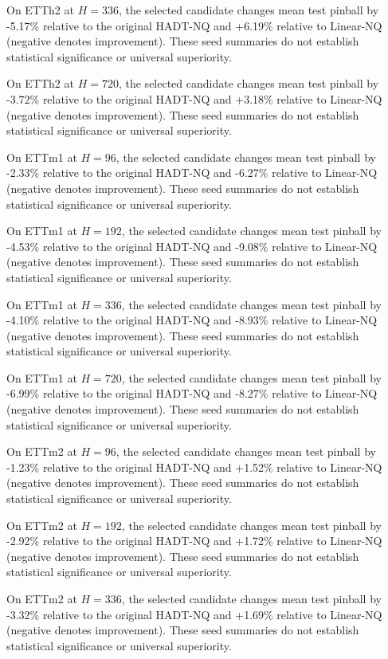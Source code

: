 On ETTh2 at $H=336$, the selected candidate changes mean test pinball by -5.17\% relative to the original HADT-NQ and +6.19\% relative to Linear-NQ (negative denotes improvement). These seed summaries do not establish statistical significance or universal superiority.

On ETTh2 at $H=720$, the selected candidate changes mean test pinball by -3.72\% relative to the original HADT-NQ and +3.18\% relative to Linear-NQ (negative denotes improvement). These seed summaries do not establish statistical significance or universal superiority.

On ETTm1 at $H=96$, the selected candidate changes mean test pinball by -2.33\% relative to the original HADT-NQ and -6.27\% relative to Linear-NQ (negative denotes improvement). These seed summaries do not establish statistical significance or universal superiority.

On ETTm1 at $H=192$, the selected candidate changes mean test pinball by -4.53\% relative to the original HADT-NQ and -9.08\% relative to Linear-NQ (negative denotes improvement). These seed summaries do not establish statistical significance or universal superiority.

On ETTm1 at $H=336$, the selected candidate changes mean test pinball by -4.10\% relative to the original HADT-NQ and -8.93\% relative to Linear-NQ (negative denotes improvement). These seed summaries do not establish statistical significance or universal superiority.

On ETTm1 at $H=720$, the selected candidate changes mean test pinball by -6.99\% relative to the original HADT-NQ and -8.27\% relative to Linear-NQ (negative denotes improvement). These seed summaries do not establish statistical significance or universal superiority.

On ETTm2 at $H=96$, the selected candidate changes mean test pinball by -1.23\% relative to the original HADT-NQ and +1.52\% relative to Linear-NQ (negative denotes improvement). These seed summaries do not establish statistical significance or universal superiority.

On ETTm2 at $H=192$, the selected candidate changes mean test pinball by -2.92\% relative to the original HADT-NQ and +1.72\% relative to Linear-NQ (negative denotes improvement). These seed summaries do not establish statistical significance or universal superiority.

On ETTm2 at $H=336$, the selected candidate changes mean test pinball by -3.32\% relative to the original HADT-NQ and +1.69\% relative to Linear-NQ (negative denotes improvement). These seed summaries do not establish statistical significance or universal superiority.

